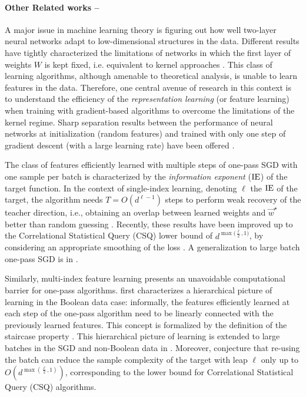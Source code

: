 \paragraph{Other Related works --} A major issue in machine learning theory is figuring out how well two-layer neural networks adapt to low-dimensional structures in the data. Different results have tightly characterized the limitations of networks in which the first layer of weights $W$ is kept fixed, i.e. equivalent to kernel approaches \citep{dietrich1999statistical,ghorbani2019limitations,ghorbani2020when,bordelon2020spectrum,loureiro2021learning,cui2021generalization}. This class of learning algorithms, although amenable to theoretical analysis, is unable to learn features in the data. Therefore, one central avenue of research in this context is to understand the efficiency of the \textit{representation learning} (or feature learning) when training with gradient-based algorithms to overcome the limitations of the kernel regime. Sharp separation results between the performance of neural networks at initialization (random features) and trained with only one step of gradient descent (with a large learning rate) have been offered \citep{ba2022high,damian2022neural,dandi2023how}. 

The class of features efficiently learned with multiple steps of one-pass SGD with one sample per batch is characterized by the \textit{information exponent} ($\rm{IE}$) \citep{arous2021online} of the target function. In the context of single-index learning, denoting $\ell$  the $\rm{IE}$ of the target, the algorithm needs $T =  O(d^{\ell -1})$  steps to perform weak recovery of the teacher direction, i.e., obtaining an overlap between learned weights and $\vec w^\star$ better than random guessing \citep{arous2021online}. Recently, these results have been improved up to the Correlational Statistical Query (CSQ) lower bound of $d^{{\max(\frac{\ell}{2}},1)}$, by considering an appropriate smoothing of the loss \citep{damian2023smoothing}. A generalization to large batch one-pass SGD is in \citep{dandi2023how}. 

Similarly, multi-index feature learning presents an unavoidable computational barrier for one-pass algorithms. \citep{abbe2021staircase} first characterizes a hierarchical picture of learning in the Boolean data case: informally, the features efficiently learned at each step of the one-pass algorithm need to be linearly connected with the previously learned features. This concept is formalized by the definition of the staircase property \citep{abbe2021staircase}. This hierarchical picture of learning is extended to large batches in the SGD and non-Boolean data in \citep{abbe2022merged,abbe2023sgd,dandi2023how}. Moreover, \citep{abbe2023sgd} conjecture that re-using the batch can reduce the sample complexity of the target with leap $\ell$ only up to $O(d^{\max(\frac{\ell}{2},1)})$, corresponding to the lower bound for Correlational Statistical Query (CSQ) algorithms. 


